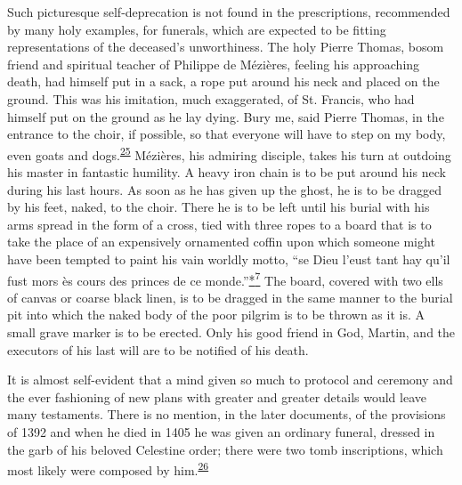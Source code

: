 Such picturesque self-deprecation is not found in the prescriptions,
recommended by many holy examples, for funerals, which are expected to
be fitting representations of the deceased's unworthiness. The holy
Pierre Thomas, bosom friend and spiritual teacher of Philippe de
Mézières, feeling his approaching death, had himself put in a sack, a
rope put around his neck and placed on the ground. This was his
imitation, much exaggerated, of St. Francis, who had himself put on the
ground as he lay dying. Bury me, said Pierre Thomas, in the entrance to
the choir, if possible, so that everyone will have to step on my body,
even goats and
dogs.\textsuperscript{\protect\hypertarget{14_Chapter_Seven__THE_PIOUS_PERSONA.xhtmlux5cux23id_974}{\protect\hyperlink{23_NOTES.xhtmlux5cux23id_975}{25}}}
Mézières, his admiring disciple, takes his turn at outdoing his master
in fantastic humility. A heavy iron chain is to be put around
\protect\hypertarget{14_Chapter_Seven__THE_PIOUS_PERSONA.xhtmlux5cux23page_210}{}{}his
neck during his last hours. As soon as he has given up the ghost, he is
to be dragged by his feet, naked, to the choir. There he is to be left
until his burial with his arms spread in the form of a cross, tied with
three ropes to a board that is to take the place of an expensively
ornamented coffin upon which someone might have been tempted to paint
his vain worldly motto, ``se Dieu l'eust tant hay qu'il fust mors ès
cours des princes de ce
monde.''\protect\hypertarget{14_Chapter_Seven__THE_PIOUS_PERSONA.xhtmlux5cux23id_2553}{\protect\hyperlink{23_NOTES.xhtmlux5cux23id_2554}{*\textsuperscript{7}}}
The board, covered with two ells of canvas or coarse black linen, is to
be dragged in the same manner to the burial pit into which the naked
body of the poor pilgrim is to be thrown as it is. A small grave marker
is to be erected. Only his good friend in God, Martin, and the executors
of his last will are to be notified of his death.

It is almost self-evident that a mind given so much to protocol and
ceremony and the ever fashioning of new plans with greater and greater
details would leave many testaments. There is no mention, in the later
documents, of the provisions of 1392 and when he died in 1405 he was
given an ordinary funeral, dressed in the garb of his beloved Celestine
order; there were two tomb inscriptions, which most likely were composed
by
him.\textsuperscript{\protect\hypertarget{14_Chapter_Seven__THE_PIOUS_PERSONA.xhtmlux5cux23id_972}{\protect\hyperlink{23_NOTES.xhtmlux5cux23id_973}{26}}}

